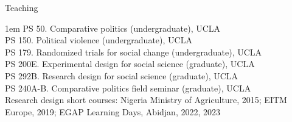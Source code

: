 \documentclass[10.9pt]{article}
\makeatletter
\newcommand\donotbreakhere{\par\nobreak\@afterheading\vspace{1em}}
\newenvironment{indnt}{\begin{adjustwidth}{1em}{}}{\end{adjustwidth}}
\makeatother
\begin{document}
{\large Teaching} \donotbreakhere
\begin{indnt}
PS 50. Comparative politics (undergraduate), UCLA\\[.75em] 
PS 150. Political violence (undergraduate), UCLA\\[.75em]
PS 179. Randomized trials for social change (undergraduate), UCLA\\[.75em] 
PS 200E. Experimental design for social science (graduate), UCLA \\[.75em]
PS 292B. Research design for social science (graduate), UCLA \\[.75em]
PS 240A-B. Comparative politics field seminar (graduate), UCLA  \\[1em]
Research design short courses: Nigeria Ministry of Agriculture, 2015; EITM Europe, 2019; EGAP Learning Days, Abidjan, 2022, 2023
\end{indnt} 
\vspace{1.5em}
\end{document}
